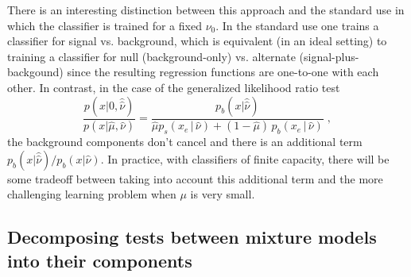 \documentclass[11pt, oneside]{article}   	%
\begin{document}
There is an interesting distinction between this approach and the standard use in which the classifier is trained for a fixed $\nu_0$. In the standard use one trains a classifier for signal vs. background, which is equivalent (in an ideal setting) to training a classifier for  null (background-only) vs. alternate (signal-plus-backgound) since the resulting regression functions are one-to-one with each other.
In contrast, in the case of the generalized likelihood ratio test 
\begin{equation}\label{eq:hep_improved}
 \frac{p(x| 0, \hat{\hat{ \nu}})}{p(x|\hat \mu, \hat\nu)} =  \frac{p_b(x| \hat{\hat{ \nu}})}{ \hat \mu p_s( x_e \, |\,  \hat\nu)  + (1- \hat \mu )\, p_b( x_e \,|\, \hat \nu)} \; ,
\end{equation}
the background components don't cancel and there is an additional term $p_b(x| \hat{\hat{ \nu}})/p_b(x| {\hat{ \nu}})$.
In practice, with classifiers of finite capacity, there will be some tradeoff between taking into account this additional term and the more challenging learning problem when $\mu$ is very small. 

\subsection{Decomposing tests between mixture models into their components}
\end{document}
